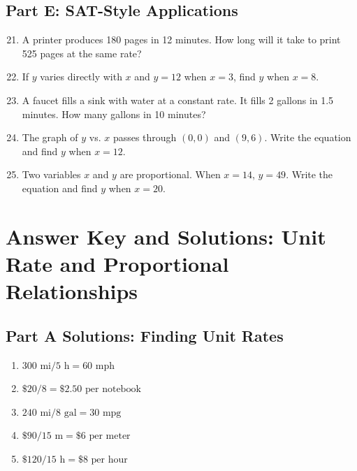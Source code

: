 \documentclass[14pt]{extarticle}
\begin{document}
\subsection*{Part E: SAT-Style Applications}
\begin{enumerate}
  \setcounter{enumi}{20}
  \item A printer produces 180 pages in 12 minutes. How long will it take to print 525 pages at the same rate?
  \item If \(y\) varies directly with \(x\) and \(y=12\) when \(x=3\), find \(y\) when \(x=8\).
  \item A faucet fills a sink with water at a constant rate. It fills 2 gallons in 1.5 minutes. How many gallons in 10 minutes?
  \item The graph of \(y\) vs. \(x\) passes through \((0,0)\) and \((9,6)\). Write the equation and find \(y\) when \(x=12\).
  \item Two variables \(x\) and \(y\) are proportional. When \(x=14\), \(y=49\). Write the equation and find \(y\) when \(x=20\).
\end{enumerate}

\newpage


\section*{Answer Key and Solutions: Unit Rate and Proportional Relationships}

\subsection*{Part A Solutions: Finding Unit Rates}
\begin{enumerate}
  \item \(300\text{ mi}/5\text{ h} = \boxed{60\text{ mph}}\)
  \item \(\$20/8 = \boxed{\$2.50 \text{ per notebook}}\)
  \item \(240\text{ mi}/8\text{ gal} = \boxed{30\text{ mpg}}\)
  \item \(\$90/15\text{ m} = \boxed{\$6 \text{ per meter}}\)
  \item \(\$120/15\text{ h} = \boxed{\$8 \text{ per hour}}\)
\end{enumerate}
\end{document}
